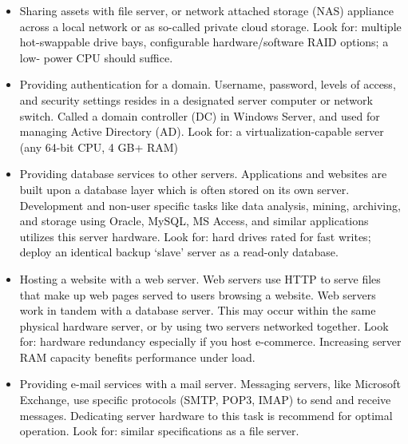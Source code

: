 \documentclass[12pt]{report}
\renewcommand{\_}{\kern-1.5pt\textunderscore\kern-1.5pt}
\begin{document}
\begin{itemize}
	\item {\fontsize{13pt}{15.6pt}\selectfont \textcolor[HTML]{0D0D0D}{Sharing assets with file server, or network attached storage (NAS) appliance across a local network or as so-called private cloud storage. Look for: multiple hot-swappable drive bays, configurable hardware/software RAID options; a low- power CPU should suﬃce.}\par}\par

	\item {\fontsize{13pt}{15.6pt}\selectfont \textcolor[HTML]{0D0D0D}{Providing authentication for a domain. Username, password, levels of access, and security settings resides in a designated server computer or network switch. Called a domain controller (DC) in Windows Server, and used for managing Active Directory (AD). Look for: a virtualization-capable server (any 64-bit CPU, 4 GB+ RAM)}\par}\par

	\item {\fontsize{13pt}{15.6pt}\selectfont \textcolor[HTML]{0D0D0D}{Providing database services to other servers. Applications and websites are built upon a database layer which is often stored on its own server. Development and non-user specific tasks like data analysis, mining, archiving, and storage using Oracle, MySQL, MS Access, and similar applications utilizes this server hardware. Look for: hard drives rated for fast writes; deploy an identical backup ‘slave’ server as a read-only database.}\par}\par


\vspace{\baselineskip}	\item {\fontsize{13pt}{15.6pt}\selectfont \textcolor[HTML]{0D0D0D}{Hosting a website with a web server. Web servers use HTTP to serve files that make up web pages served to users browsing a website. Web servers work in tandem with a database server. This may occur within the same physical hardware server, or by using two servers networked together. Look for: hardware redundancy especially if you host e-commerce. Increasing server RAM capacity benefits performance under load.}\par}\par

	\item {\fontsize{13pt}{15.6pt}\selectfont \textcolor[HTML]{0D0D0D}{Providing e-mail services with a mail server. Messaging servers, like Microsoft Exchange, use specific protocols (SMTP, POP3, IMAP) to send and receive messages. Dedicating server hardware to this task is recommend for optimal operation. Look for: similar specifications as a file server.}\par}\par


\end{itemize}
\end{document}

